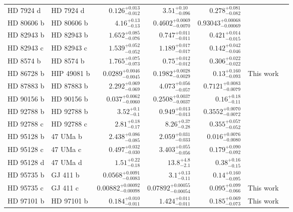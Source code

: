 \begin{longtable*}{llrrrrr}
HD 7924 d & HD 7924 d & $0.126^{+0.013}_{-0.012}$ & $3.51^{+0.10}_{-0.096}$ & $0.278^{+0.081}_{-0.082}$ & \cite{Fulton15} & \\
HD 80606 b & HD 80606 b & $4.16^{+0.13}_{-0.13}$ & $0.4602^{+0.0069}_{-0.0070}$ & $0.93043^{+0.00068}_{-0.00069}$ & \cite{Wittenmyer07} & \\
HD 82943 b & HD 82943 b & $1.652^{+0.085}_{-0.076}$ & $0.747^{+0.011}_{-0.011}$ & $0.421^{+0.014}_{-0.015}$ & \cite{Mayor04} & \\
HD 82943 c & HD 82943 c & $1.539^{+0.052}_{-0.052}$ & $1.189^{+0.017}_{-0.017}$ & $0.142^{+0.042}_{-0.046}$ & \cite{Mayor04} & \\
HD 8574 b & HD 8574 b & $1.765^{+0.075}_{-0.073}$ & $0.75^{+0.012}_{-0.012}$ & $0.306^{+0.022}_{-0.022}$ & \cite{Perrier03} & \\
HD 86728 b & HIP 49081 b & $0.0289^{+0.0046}_{-0.0045}$ & $0.1982^{+0.0028}_{-0.0029}$ & $0.13^{+0.160}_{-0.093}$ & This work & \\
HD 87883 b & HD 87883 b & $2.292^{+0.069}_{-0.069}$ & $4.073^{+0.056}_{-0.057}$ & $0.7121^{+0.0083}_{-0.0079}$ & \cite{Fischer09} & \\
HD 90156 b & HD 90156 b & $0.037^{+0.0062}_{-0.0060}$ & $0.2508^{+0.0037}_{-0.0037}$ & $0.16^{+0.18}_{-0.11}$ & \cite{Mordasini11} & \\
HD 92788 b & HD 92788 b & $3.52^{+0.1}_{-0.1}$ & $0.949^{+0.013}_{-0.013}$ & $0.3552^{+0.0070}_{-0.0072}$ & \cite{Fischer01} & \\
HD 92788 c & HD 92788 c & $2.81^{+0.18}_{-0.17}$ & $8.26^{+0.37}_{-0.28}$ & $0.355^{+0.057}_{-0.052}$ & \cite{Rickman19} & \\
HD 95128 b & 47 UMa b & $2.438^{+0.086}_{-0.085}$ & $2.059^{+0.031}_{-0.033}$ & $0.016^{+0.0076}_{-0.0080}$ & \cite{Naef04} & \\
HD 95128 c & 47 UMa c & $0.497^{+0.032}_{-0.030}$ & $3.403^{+0.055}_{-0.056}$ & $0.179^{+0.090}_{-0.092}$ & \cite{Wittenmyer07} & \\
HD 95128 d & 47 UMa d & $1.51^{+0.22}_{-0.18}$ & $13.8^{+4.8}_{-2.1}$ & $0.38^{+0.16}_{-0.15}$ & \cite{Gregory10} & \\
HD 95735 b & GJ 411 b & $0.0568^{+0.0091}_{-0.0083}$ & $3.1^{+0.13}_{-0.11}$ & $0.14^{+0.160}_{-0.095}$ & \cite{Diaz19} & \\
HD 95735 c & GJ 411 c & $0.00882^{+0.00092}_{-0.00098}$ & $0.07892^{+0.00055}_{-0.00054}$ & $0.095^{+0.099}_{-0.066}$ & This work & \\
HD 97101 b & HD 97101 b & $0.184^{+0.010}_{-0.011}$ & $1.424^{+0.011}_{-0.011}$ & $0.185^{+0.069}_{-0.073}$ & This work & \\

\end{longtable*}
